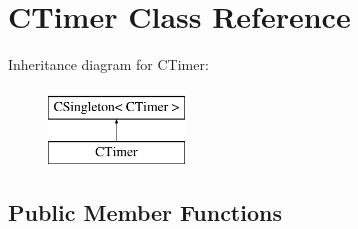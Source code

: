 \hypertarget{class_c_timer}{
\section{CTimer Class Reference}
\label{class_c_timer}
}
Inheritance diagram for CTimer:\begin{figure}[H]
\begin{center}
\leavevmode
\includegraphics[height=2cm]{class_c_timer}
\end{center}
\end{figure}
\subsection*{Public Member Functions}
